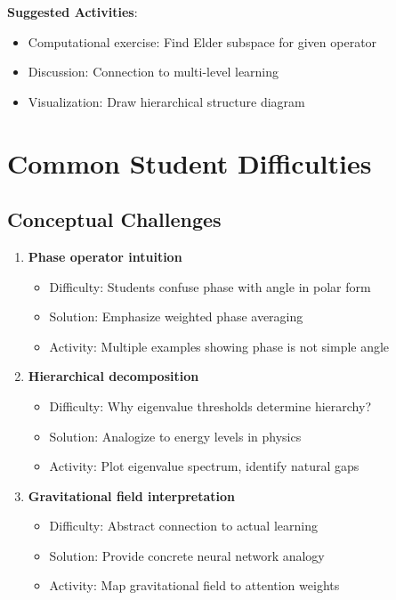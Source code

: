 \documentclass[12pt,a4paper]{article}
\begin{document}
\textbf{Suggested Activities}:
\begin{itemize}
    \item Computational exercise: Find Elder subspace for given operator
    \item Discussion: Connection to multi-level learning
    \item Visualization: Draw hierarchical structure diagram
\end{itemize}

\section{Common Student Difficulties}

\subsection{Conceptual Challenges}

\begin{enumerate}
    \item \textbf{Phase operator intuition}
    \begin{itemize}
        \item Difficulty: Students confuse phase with angle in polar form
        \item Solution: Emphasize weighted phase averaging
        \item Activity: Multiple examples showing phase is not simple angle
    \end{itemize}
    
    \item \textbf{Hierarchical decomposition}
    \begin{itemize}
        \item Difficulty: Why eigenvalue thresholds determine hierarchy?
        \item Solution: Analogize to energy levels in physics
        \item Activity: Plot eigenvalue spectrum, identify natural gaps
    \end{itemize}
    
    \item \textbf{Gravitational field interpretation}
    \begin{itemize}
        \item Difficulty: Abstract connection to actual learning
        \item Solution: Provide concrete neural network analogy
        \item Activity: Map gravitational field to attention weights
    \end{itemize}
\end{enumerate}
\end{document}
